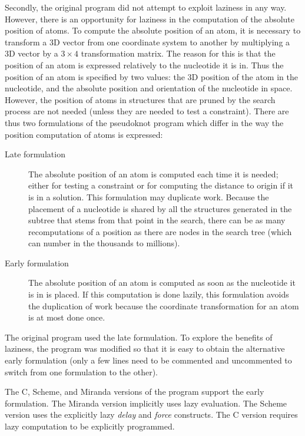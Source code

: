 Secondly, the original program did not attempt to exploit laziness in
any way. However, there is an opportunity for laziness in the
computation of the absolute position of atoms. To compute the absolute
position of an atom, it is necessary to transform a 3D vector from one
coordinate system to another by multiplying a 3D vector by a $3 \times
4$ transformation matrix. The reason for this is that the position of
an atom is expressed relatively to the nucleotide it is in. Thus the
position of an atom is specified by two values: the 3D position of the
atom in the nucleotide, and the absolute position and orientation of
the nucleotide in space. However, the position of atoms in structures
that are pruned by the search process are not needed (unless they are
needed to test a constraint). There are thus two formulations of the
pseudoknot program which differ in the way the position computation of
atoms is expressed:
\begin{description}
\item[Late formulation]
The absolute position of an atom is computed each time it is needed;
either for testing a constraint or for computing the distance to
origin if it is in a solution. This formulation may duplicate
work. Because the placement of a nucleotide is shared by all the
structures generated in the subtree that stems from that point in the
search, there can be as many recomputations of a position as there are
nodes in the search tree (which can number in the thousands to
millions).
\item[Early formulation]
The absolute position of an atom is computed as soon as the nucleotide
it is in is placed. If this computation is done lazily, this
formulation avoids the duplication of work because the coordinate
transformation for an atom is at most done once.
\end{description}
The original program used the late formulation. To explore the
benefits of laziness, the program was modified so that it is easy to
obtain the alternative early formulation (only a few lines need to be
commented and uncommented to switch from one formulation to the
other).

The C, Scheme, and Miranda versions of the program support the early
formulation. The Miranda version implicitly uses lazy evaluation. The
Scheme version uses the explicitly lazy {\em delay} and {\em force}
constructs.  The C version requires lazy computation to be explicitly
programmed.

